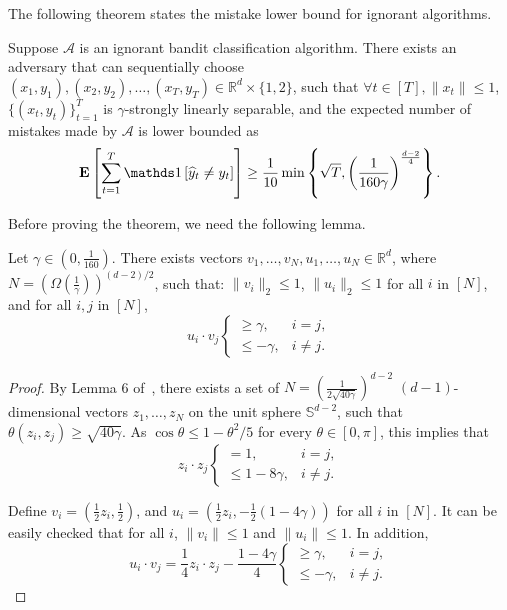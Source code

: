 The following theorem states the mistake lower bound for ignorant algorithms.
\begin{theorem}
\label{theorem:ignorant_lower_bound}
    Suppose $\mathcal{A}$ is an ignorant bandit classification algorithm.
    There exists an adversary that can sequentially choose $(x_1, y_1), (x_2, y_2), \ldots, (x_T, y_T) \in \mathbb{R}^d\times \{1,2\}$,
    such that $\forall t\in[T], \|x_t\|\leq 1$, $\{(x_t, y_t)\}_{t=1}^T$ is $\gamma$-strongly linearly separable,
    and the expected number of mistakes made by $\mathcal{A}$ is lower bounded as
    \begin{align*}
        \Exp\left[ \sum_{t=1}^T \indicator{\widehat y_t \neq y_t} \right] \geq \frac{1}{10}\min\left\{\sqrt{T},
        \left(\frac{1}{160\gamma}\right)^{\frac{d-2}{4}} \right\}.
    \end{align*}
\end{theorem}
Before proving the theorem, we need the following lemma.
\begin{lemma}
\label{lem:embed_d_gamma}
Let $\gamma \in (0,\frac 1 {160})$.
There exists vectors $v_1, \ldots, v_N, u_1, \ldots, u_N\in \mathbb{R}^d$, where $N = (\Omega(\frac{1}{\gamma}))^{(d-2)/2}$, such that:
$\| v_i \|_2 \leq 1$, $\| u_i \|_2 \leq 1$ for all $i$ in $[N]$, and for all $i, j$ in $[N]$,
\[ u_i \cdot v_j \begin{cases} \geq \gamma ,& i = j, \\ \leq -\gamma ,& i \neq j. \end{cases} \]
\end{lemma}
\begin{proof}
By Lemma 6 of~\cite{Long-1995}, there exists a set of $N = (\frac{1}{2\sqrt{40\gamma}})^{d-2}$ $(d-1)$-dimensional vectors $z_1, \ldots, z_N$ on the unit sphere $\mathbb{S}^{d-2}$, such that
$\theta(z_i, z_j) \geq \sqrt{40 \gamma}$. As $\cos\theta \leq 1-\theta^2/5$ for every $\theta \in [0,\pi]$,
this implies that
\[ z_i \cdot z_j \begin{cases} = 1 ,& i = j, \\ \leq 1- 8\gamma ,& i \neq j. \end{cases} \]

Define $v_i = (\frac12 z_i, \frac12)$, and $u_i = (\frac 12 z_i, -\frac 12(1-4\gamma))$ for all $i$ in $[N]$. It can be easily checked that for all $i$, $\|v_i\| \leq 1$ and $\|u_i\| \leq 1$. In addition,
\[ u_i \cdot v_j = \frac 1 4 z_i \cdot z_j - \frac {1-4\gamma} 4 \begin{cases} \geq \gamma ,& i = j, \\ \leq -\gamma ,& i \neq j. \end{cases}\]
\end{proof}

